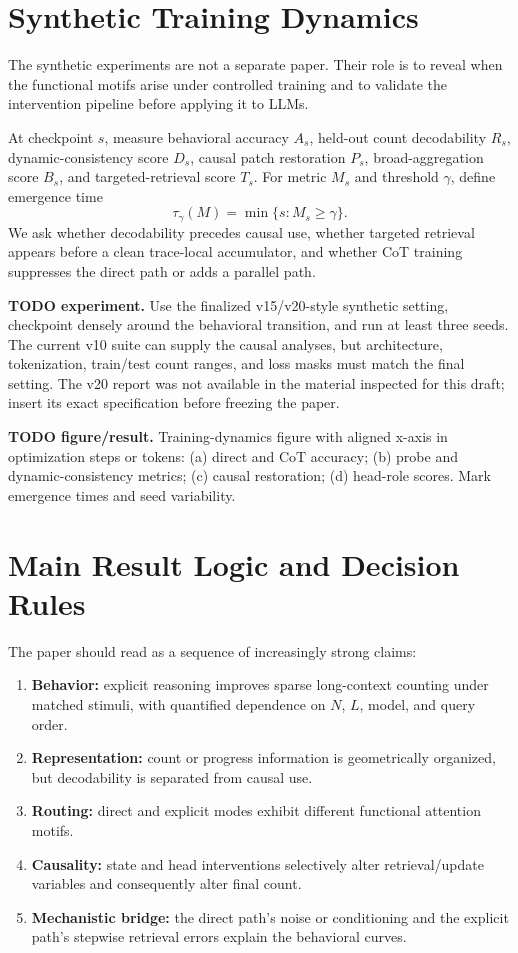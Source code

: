 \documentclass[10pt,twocolumn]{article}
\newcommand{\todoexp}[1]{%
  \par\noindent\textcolor{red!75!black}{\textbf{TODO experiment.} #1}\par}
\newcommand{\todoplot}[1]{%
  \par\noindent\textcolor{red!75!black}{\textbf{TODO figure/result.} #1}\par}
\begin{document}
\section{Synthetic Training Dynamics}
The synthetic experiments are not a separate paper. Their role is to reveal when the functional
motifs arise under controlled training and to validate the intervention pipeline before applying
it to LLMs.

At checkpoint $s$, measure behavioral accuracy $A_s$, held-out count decodability $R_s$,
dynamic-consistency score $D_s$, causal patch restoration $P_s$, broad-aggregation score $B_s$,
and targeted-retrieval score $T_s$. For metric $M_s$ and threshold $\gamma$, define emergence time
\[
    \tau_\gamma(M)=\min\{s:M_s\ge\gamma\}.
\]
We ask whether decodability precedes causal use, whether targeted retrieval appears before a clean
trace-local accumulator, and whether CoT training suppresses the direct path or adds a parallel
path.

\todoexp{Use the finalized v15/v20-style synthetic setting, checkpoint densely around the behavioral
transition, and run at least three seeds. The current v10 suite can supply the causal analyses,
but architecture, tokenization, train/test count ranges, and loss masks must match the final
setting. The v20 report was not available in the material inspected for this draft; insert its
exact specification before freezing the paper.}

\todoplot{Training-dynamics figure with aligned x-axis in optimization steps or tokens:
(a) direct and CoT accuracy; (b) probe and dynamic-consistency metrics; (c) causal restoration;
(d) head-role scores. Mark emergence times and seed variability.}

\section{Main Result Logic and Decision Rules}
The paper should read as a sequence of increasingly strong claims:
\begin{enumerate}
\item \textbf{Behavior:} explicit reasoning improves sparse long-context counting under matched
stimuli, with quantified dependence on $N$, $L$, model, and query order.
\item \textbf{Representation:} count or progress information is geometrically organized, but
decodability is separated from causal use.
\item \textbf{Routing:} direct and explicit modes exhibit different functional attention motifs.
\item \textbf{Causality:} state and head interventions selectively alter retrieval/update variables
and consequently alter final count.
\item \textbf{Mechanistic bridge:} the direct path's noise or conditioning and the explicit path's
stepwise retrieval errors explain the behavioral curves.
\end{enumerate}
\end{document}
